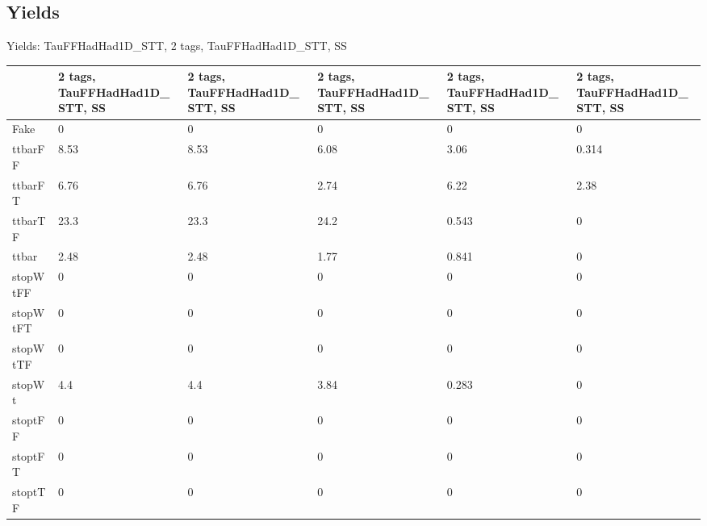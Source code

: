 
\subsection{Yields}

\begin{frame}{Yields: TauFFHadHad1D\_STT, 2 tags, TauFFHadHad1D\_STT, SS}
\begin{center}
  \begin{tabular}{l| >{\centering\let\newline\\\arraybackslash\hspace{0pt}}m{1.4cm}| >{\centering\let\newline\\\arraybackslash\hspace{0pt}}m{1.4cm}| >{\centering\let\newline\\\arraybackslash\hspace{0pt}}m{1.4cm}| >{\centering\let\newline\\\arraybackslash\hspace{0pt}}m{1.4cm}| >{\centering\let\newline\\\arraybackslash\hspace{0pt}}m{1.4cm}}
    & 2 tags, TauFFHadHad1D\_STT, SS & 2 tags, TauFFHadHad1D\_STT, SS & 2 tags, TauFFHadHad1D\_STT, SS & 2 tags, TauFFHadHad1D\_STT, SS & 2 tags, TauFFHadHad1D\_STT, SS \\
 \hline \hline
    Fake& 0 & 0 & 0 & 0 & 0 \\
 \hline
    ttbarFF& 8.53 & 8.53 & 6.08 & 3.06 & 0.314 \\
 \hline
    ttbarFT& 6.76 & 6.76 & 2.74 & 6.22 & 2.38 \\
 \hline
    ttbarTF& 23.3 & 23.3 & 24.2 & 0.543 & 0 \\
 \hline
    ttbar& 2.48 & 2.48 & 1.77 & 0.841 & 0 \\
 \hline
    stopWtFF& 0 & 0 & 0 & 0 & 0 \\
 \hline
    stopWtFT& 0 & 0 & 0 & 0 & 0 \\
 \hline
    stopWtTF& 0 & 0 & 0 & 0 & 0 \\
 \hline
    stopWt& 4.4 & 4.4 & 3.84 & 0.283 & 0 \\
 \hline
    stoptFF& 0 & 0 & 0 & 0 & 0 \\
 \hline
    stoptFT& 0 & 0 & 0 & 0 & 0 \\
 \hline
    stoptTF& 0 & 0 & 0 & 0 & 0 \\

\end{tabular}
\end{center}
\end{frame}
